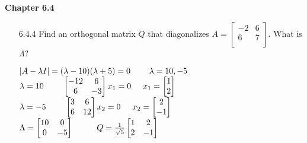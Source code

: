 \documentclass[10pt,twoside,reqno]{article}
\begin{document}
\vspace{5mm}
\textbf{Chapter 6.4}
\begin{enumerate}
\item[6.4.4] Find an orthogonal matrix $Q$ that diagonalizes $A=
\begin{bmatrix}
-2&6\\
6&7\\
\end{bmatrix}$. What is $\Lambda$?
\\ \vspace{2mm}
\begin{center}
$
|A- \lambda I|=
(\lambda-10)(\lambda+5) = 0
\hspace{8mm} \lambda=10,-5
$\\
$
\lambda = 10 \hspace{8mm}
\begin{bmatrix}
-12&6\\
6&-3\\
\end{bmatrix}
x_1=0
\hspace{5mm}
x_1 = 
\begin{bmatrix}
1\\
2\\
\end{bmatrix}
$ \\
$
\lambda = -5 \hspace{8mm}
\begin{bmatrix}
3&6\\
6&12\\
\end{bmatrix}
x_2=0
\hspace{5mm}
x_2 = 
\begin{bmatrix}
2\\
-1\\
\end{bmatrix}
$ \\
$
\Lambda = 
\begin{bmatrix}
10&0\\
0&-5\\
\end{bmatrix}
\hspace{10mm}
Q=
\frac{1}{\sqrt{5}}
\begin{bmatrix}
1&2\\
2&-1\\
\end{bmatrix}
$ \\
\end{center}


\end{enumerate}
\end{document}
